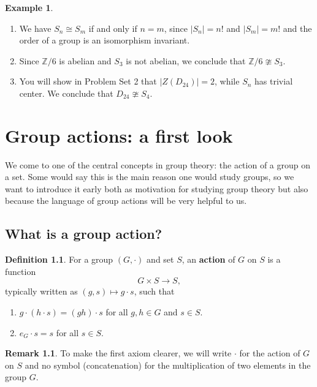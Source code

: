 \documentclass[12pt]{report}
\numberwithin{equation}{section}
\numberwithin{theorem}{chapter}
\theoremstyle{definition}
\newtheorem{definition}[theorem]{Definition}
\newtheorem{example}[theorem]{Example}
\newtheorem*{basic properties}{Basic Properties}
\newtheorem*{Important Remark}{Important Remark}
\newtheorem{remark}[theorem]{Remark}
\newcommand{\df}[1]{{\bf #1}\index{#1}}
\newcommand{\Z}{\mathbb{Z}}
\begin{document}
\begin{example}$\,$
\begin{enumerate}
\item We have $S_n\cong S_m$ if and only if $n=m$, since $|S_n| = n!$ and $|S_m| = m!$ and the order of a group is an isomorphism invariant.
\item Since $\Z/6$ is abelian and $S_3$ is not abelian, we conclude that $\Z/6\ncong S_3$.
\item You will show in Problem Set 2 that $|Z(D_{24})|=2$, while $S_n$ has trivial center. We conclude that $D_{24}\ncong S_4$.
\end{enumerate}
\end{example}




\chapter{Group actions: a first look}


We come to one of the central concepts in group theory: the action of a group on a set. Some would say this is the main reason one would study groups, so we want to introduce it early both as motivation for studying group theory but also because the language of group actions will be very helpful to us.




\section{What is a group action?}


\begin{definition}\label{defn:groupaction}
For a group $(G, \cdot)$ and set $S$, an \df{action} of $G$ on $S$ is a function
$$G \times S \to S,$$
typically written as $(g,s) \mapsto g \cdot s$, such that
\begin{enumerate}
\item $g \cdot (h \cdot s) = (g h) \cdot s$ for all $g,h \in G$ and $s\in S$. 
\item $e_G \cdot s = s$ for all $s \in S$.
\end{enumerate}
\end{definition}

\begin{remark} 
	To make the first axiom clearer, we will write $\cdot$ for the action of $G$ on $S$ and no symbol (concatenation) for the multiplication of two elements in the group $G$.
\end{remark}
\end{document}

